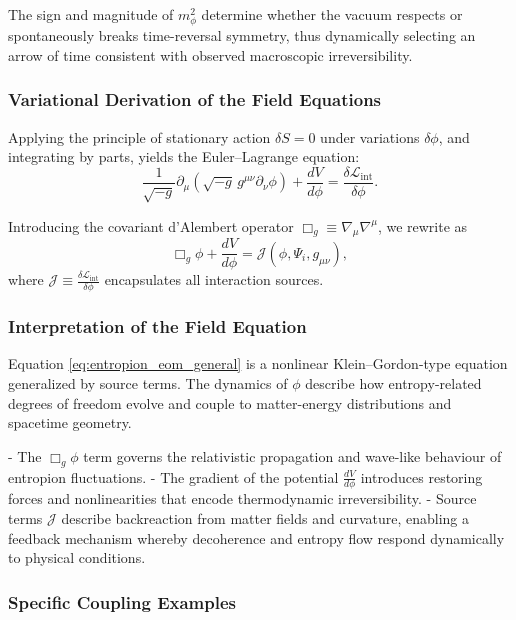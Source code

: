 \documentclass[12pt]{article}
\begin{document}
The sign and magnitude of \(m_\phi^2\) determine whether the vacuum respects or spontaneously breaks time-reversal symmetry, thus dynamically selecting an arrow of time consistent with observed macroscopic irreversibility.

\subsubsection*{Variational Derivation of the Field Equations}

Applying the principle of stationary action \(\delta S = 0\) under variations \(\delta \phi\), and integrating by parts, yields the Euler–Lagrange equation:
\begin{equation}
    \frac{1}{\sqrt{-g}} \partial_\mu \left( \sqrt{-g} \, g^{\mu\nu} \partial_\nu \phi \right) + \frac{dV}{d\phi} = \frac{\delta \mathcal{L}_{\mathrm{int}}}{\delta \phi}.
    \label{eq:entropion_variation}
\end{equation}

Introducing the covariant d’Alembert operator \(\Box_g \equiv \nabla_\mu \nabla^\mu\), we rewrite as
\begin{equation}
    \Box_g \phi + \frac{dV}{d\phi} = \mathcal{J}(\phi, \Psi_i, g_{\mu\nu}),
    \label{eq:entropion_eom_general}
\end{equation}
where \(\mathcal{J} \equiv \frac{\delta \mathcal{L}_{\mathrm{int}}}{\delta \phi}\) encapsulates all interaction sources.

\subsubsection*{Interpretation of the Field Equation}

Equation \eqref{eq:entropion_eom_general} is a nonlinear Klein–Gordon-type equation generalized by source terms. The dynamics of \(\phi\) describe how entropy-related degrees of freedom evolve and couple to matter-energy distributions and spacetime geometry.

- The \(\Box_g \phi\) term governs the relativistic propagation and wave-like behaviour of entropion fluctuations.
- The gradient of the potential \(\frac{dV}{d\phi}\) introduces restoring forces and nonlinearities that encode thermodynamic irreversibility.
- Source terms \(\mathcal{J}\) describe backreaction from matter fields and curvature, enabling a feedback mechanism whereby decoherence and entropy flow respond dynamically to physical conditions.

\subsubsection*{Specific Coupling Examples}
\end{document}
